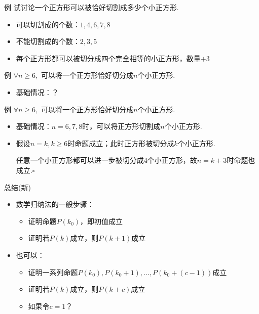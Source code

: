 \documentclass[]{beamer}
\begin{document}
\begin{frame}{例}
    试讨论一个正方形可以被恰好切割成多少个小正方形.
    \begin{itemize}
        \item 可以切割成的个数：$1,4,6,7,8$
        \item 不能切割成的个数：$2,3,5$
        \item 每个正方形都可以被切分成四个完全相等的小正方形，数量$+3$
    \end{itemize}
\end{frame}

\begin{frame}{例}
    $\forall n\ge 6,$ 可以将一个正方形恰好切分成$n$个小正方形.
    \begin{itemize}
        \item 基础情况：\color{red}？
    \end{itemize}
\end{frame}

\begin{frame}{例}
    $\forall n\ge 6,$ 可以将一个正方形恰好切分成$n$个小正方形.
    \begin{itemize}
        \item 基础情况：$n=6,7,8$时，可以将正方形切割成$n$个小正方形.
        \item 假设$n=k,k\ge6$时命题成立；此时正方形被切分成$k$个小正方形.
        
        任意一个小正方形都可以进一步被切分成$4$个小正方形，故$n=k+3$时命题也成立.$\square$
    \end{itemize}
\end{frame}

\begin{frame}{总结(新)}
    \begin{itemize}
        \item 数学归纳法的一般步骤：
        \begin{itemize}
            \item 证明命题$P(k_0)$，即初值成立
            \item 证明若$P(k)$成立，则$P(k+1)$成立
        \end{itemize}
        \item 也可以：
        \begin{itemize}
            \item 证明一系列命题$P(k_0),P(k_0+1),\ldots,P(k_0+(c-1))$成立
            \item 证明若$P(k)$成立，则$P(k+c)$成立
            \item 如果令$c=1$？
        \end{itemize}
    \end{itemize}
\end{frame}
\end{document}
